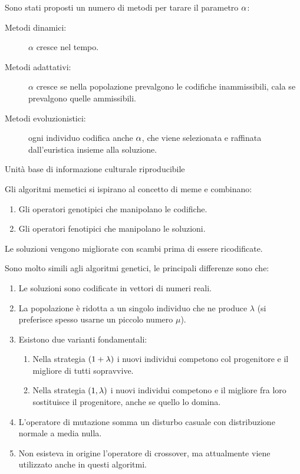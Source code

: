 \documentclass[\main/main.tex]{subfiles}
\begin{document}
\begin{multicols}{2}
\begin{observation}
    Sono stati proposti un numero di metodi per tarare il parametro \(\alpha\):
    \begin{description}
        \item[Metodi dinamici:] \(\alpha\) cresce nel tempo.
        \item[Metodi adattativi:] \(\alpha\) cresce se nella popolazione prevalgono le codifiche inammissibili, cala se prevalgono quelle ammissibili.
        \item[Metodi evoluzionistici:] ogni individuo codifica anche \(\alpha\), che viene selezionata e raffinata dall'euristica insieme alla soluzione.
    \end{description}
\end{observation}
\begin{definition}[Meme]
    Unità base di informazione culturale riproducibile
\end{definition}
\begin{definition}
    Gli algoritmi memetici si ispirano al concetto di meme e combinano:
    \begin{enumerate}
        \item Gli operatori genotipici che manipolano le codifiche.
        \item Gli operatori fenotipici che manipolano le soluzioni.
    \end{enumerate}
    
    Le soluzioni vengono migliorate con scambi prima di essere ricodificate.
\end{definition}
\begin{definition}
    Sono molto simili agli algoritmi genetici, le principali differenze sono che:
    \begin{enumerate}
        \item Le soluzioni sono codificate in vettori di numeri reali.
        \item La popolazione è ridotta a un singolo individuo che ne produce \(\lambda\) (si preferisce spesso usarne un piccolo numero \(\mu\)).
        \item Esistono due varianti fondamentali:
        \begin{enumerate}
            \item Nella strategia \(\left(1+\lambda\right)\) i nuovi individui competono col progenitore e il migliore di tutti sopravvive.
            \item Nella strategia \(\left(1, \lambda\right)\) i nuovi individui competono e il migliore fra loro sostituisce il progenitore, anche se quello lo domina.
        \end{enumerate}
        \item L'operatore di mutazione somma un disturbo casuale con distribuzione normale a media nulla.
        \item Non esisteva in origine l'operatore di crossover, ma attualmente viene utilizzato anche in questi algoritmi.
    \end{enumerate}
\end{definition}
\end{multicols}
\end{document}

